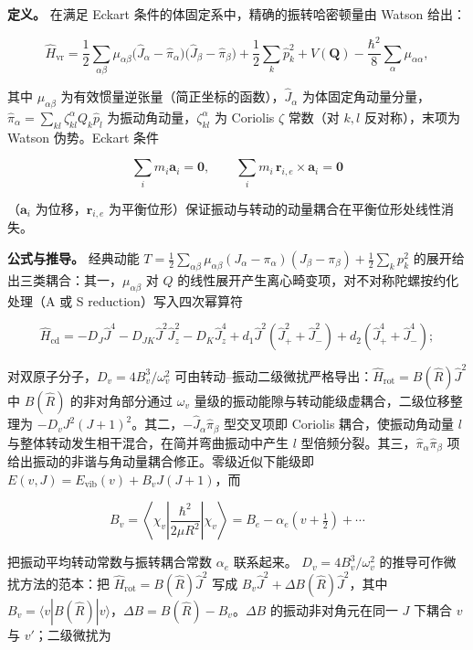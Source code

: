 \documentclass[
]{ctexbook}
\begin{document}
\textbf{定义。} 在满足 Eckart 条件的体固定系中，精确的振转哈密顿量由
Watson 给出：

\[\hat{H}_{\mathrm{vr}}=\frac{1}{2}\sum_{\alpha\beta}\mu_{\alpha\beta}\bigl(\hat{J}_{\alpha}-\hat{\pi}_{\alpha}\bigr)\bigl(\hat{J}_{\beta}-\hat{\pi}_{\beta}\bigr)
+\frac{1}{2}\sum_{k}\hat{p}_{k}^{2}+V(\mathbf{Q})
-\frac{\hbar^{2}}{8}\sum_{\alpha}\mu_{\alpha\alpha},\]

其中 \(\mu_{\alpha\beta}\)
为有效惯量逆张量（简正坐标的函数），\(\hat{J}_{\alpha}\)
为体固定角动量分量，\(\hat{\pi}_{\alpha}=\sum_{kl}\zeta^{\alpha}_{kl}Q_k\hat{p}_l\)
为振动角动量，\(\zeta^{\alpha}_{kl}\) 为 Coriolis \(\zeta\) 常数（对
\(k,l\) 反对称），末项为 Watson 伪势。Eckart 条件

\[\sum_i m_i\mathbf{a}_i=\mathbf{0},\qquad \sum_i m_i\,\mathbf{r}_{i,e}\times\mathbf{a}_i=\mathbf{0}\]

（\(\mathbf{a}_i\) 为位移，\(\mathbf{r}_{i,e}\)
为平衡位形）保证振动与转动的动量耦合在平衡位形处线性消失。

\textbf{公式与推导。} 经典动能
\(T=\frac12\sum_{\alpha\beta}\mu_{\alpha\beta}(J_{\alpha}-\pi_{\alpha})(J_{\beta}-\pi_{\beta})+\frac12\sum_k p_k^{2}\)
的展开给出三类耦合：其一，\(\mu_{\alpha\beta}\) 对 \(Q\)
的线性展开产生离心畸变项，对不对称陀螺按约化处理（A 或 S
reduction）写入四次幂算符

\[\hat{H}_{\mathrm{cd}}=-D_J\hat{J}^{4}-D_{JK}\hat{J}^{2}\hat{J}_z^{2}-D_K\hat{J}_z^{4}+d_1\hat{J}^{2}(\hat{J}_{+}^{2}+\hat{J}_{-}^{2})+d_2(\hat{J}_{+}^{4}+\hat{J}_{-}^{4});\]

对双原子分子，\(D_v=4B_v^{3}/\omega_v^{2}\)
可由转动--振动二级微扰严格导出：\(\hat{H}_{\mathrm{rot}}=B(\hat{R})\hat{J}^{2}\)
中 \(B(\hat{R})\) 的非对角部分通过 \(\omega_v\)
量级的振动能隙与转动能级虚耦合，二级位移整理为
\(-D_vJ^{2}(J+1)^{2}\)。其二，\(-\hat{J}_{\alpha}\hat{\pi}_{\beta}\)
型交叉项即 Coriolis 耦合，使振动角动量 \(l\)
与整体转动发生相干混合，在简并弯曲振动中产生 \(l\)
型倍频分裂。其三，\(\hat{\pi}_{\alpha}\hat{\pi}_{\beta}\)
项给出振动的非谐与角动量耦合修正。零级近似下能级即
\(E(v,J)=E_{\mathrm{vib}}(v)+B_vJ(J+1)\)，而

\[B_v=\left\langle\chi_v\left|\frac{\hbar^{2}}{2\mu R^{2}}\right|\chi_v\right\rangle
=B_e-\alpha_e\left(v+\tfrac12\right)+\cdots\]

把振动平均转动常数与振转耦合常数 \(\alpha_e\) 联系起来。
\(D_v=4B_v^{3}/\omega_v^{2}\) 的推导可作微扰方法的范本：把
\(\hat{H}_{\mathrm{rot}}=B(\hat{R})\hat{J}^{2}\) 写成
\(B_v\hat{J}^{2}+\Delta B(\hat{R})\hat{J}^{2}\)，其中
\(B_v=\langle v|B(\hat{R})|v\rangle\)，\(\Delta B=B(\hat{R})-B_v\)。\(\Delta B\)
的振动非对角元在同一 \(J\) 下耦合 \(v\) 与 \(v'\)；二级微扰为
\end{document}
